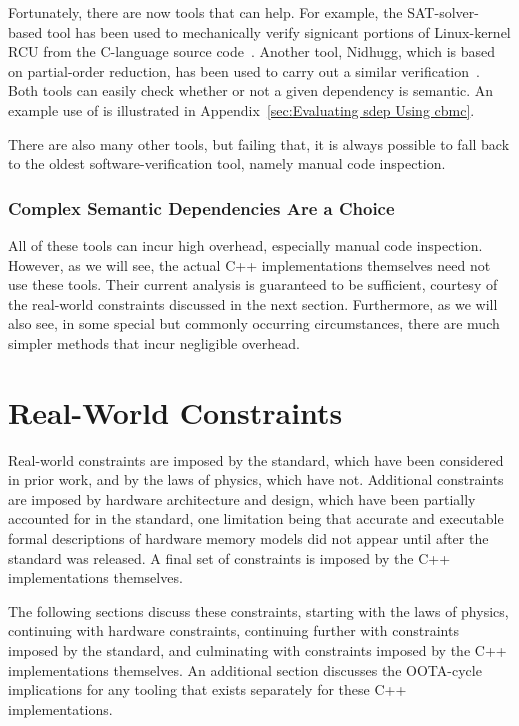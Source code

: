 \documentclass[10]{article}
\begin{document}
Fortunately, there are now tools that can help.
For example, the SAT-solver-based  tool
has been used to mechanically verify signicant portions of Linux-kernel
RCU from the C-language source
code~\cite{LihaoLiang2016VerifyTreeRCU,LanceRoy2017CBMC-SRCU}.
Another tool, Nidhugg, which is based on partial-order
reduction, has been used to carry out a similar
verification~\cite{MichalisKokologiannakis2017NidhuggRCU,SMC-TreeRCU,MichalisKokologiannakis2019RCUstatelessModelCheck}.
Both tools can easily check whether or not a given dependency is semantic.
An example use of  is illustrated in
Appendix~\ref{sec:Evaluating sdep Using cbmc}.

There are also many other tools, but failing that, it is always possible
to fall back to the oldest software-verification tool, namely manual
code inspection.

\subsubsection{Complex Semantic Dependencies Are a Choice}
\label{sec:Complex Semantic Dependencies Are a Choice}

All of these tools can incur high overhead, especially manual code
inspection.
However, as we will see, the actual C++ implementations themselves need
not use these tools.
Their current analysis is guaranteed to be sufficient, courtesy of the
real-world constraints discussed in the next section.
Furthermore, as we will also see, in some special but commonly occurring
circumstances, there are much simpler methods that incur negligible overhead.

\section{Real-World Constraints}
\label{sec:Real-World Constraints}

Real-world constraints are imposed by the standard, which have been
considered in prior work, and by the laws of physics, which have
not.
Additional constraints are imposed by hardware architecture and
design, which have been partially accounted for in the standard,
one limitation being that accurate and executable formal descriptions
of hardware memory models did not appear until after the standard
was released.
A final set of constraints is imposed by the C++ implementations
themselves.

The following sections discuss these constraints, starting with the
laws of physics, continuing with hardware constraints, continuing
further with constraints imposed by the standard, and culminating
with constraints imposed by the C++ implementations themselves.
An additional section discusses the OOTA-cycle implications for
any tooling that exists separately for these C++ implementations.
\end{document}

